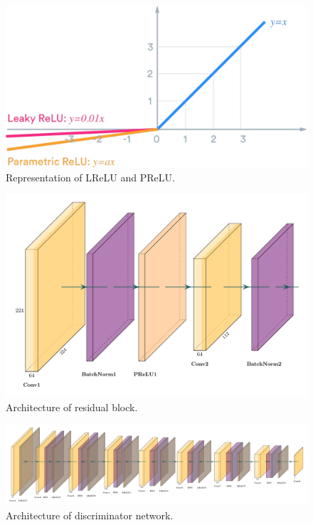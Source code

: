 \documentclass[10pt,twocolumn,letterpaper]{article}
\begin{document}
 \begin{figure}
\begin{center}
\includegraphics[width=1\textwidth]{fig5}
\end{center}
   \caption{Representation of LReLU and PReLU.}
\label{fig5}
\end{figure}

 \begin{figure}
\begin{center}
\includegraphics[width=1\textwidth]{fig6}
\end{center}
   \caption{Architecture of residual block.}
\label{fig6}
\end{figure}

 \begin{figure}
\begin{center}
\includegraphics[width=1\textwidth]{fig7}
\end{center}
   \caption{Architecture of discriminator network.}
\label{fig7}
\end{figure}
\end{document}
